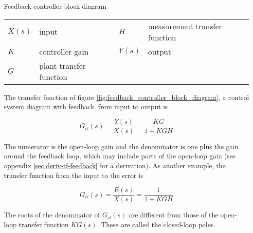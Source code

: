 \begin{bookfigure}

  \caption{Feedback controller block diagram}
  \label{fig:feedback_controller_block_diagram}

  \begin{figurekey}
    \begin{tabulary}{\linewidth}{LLLL}
      $X(s)$ & input & $H$ & measurement transfer function \\
      $K$ & controller gain & $Y(s)$ & output \\
      $G$ & plant transfer function & & \\
    \end{tabulary}
  \end{figurekey}
\end{bookfigure}

The transfer function of figure \ref{fig:feedback_controller_block_diagram}, a
control system diagram with feedback, from input to output is

\begin{equation}
  G_{cl}(s) = \frac{Y(s)}{X(s)} = \frac{KG}{1 + KGH}
\end{equation}

The numerator is the \gls{open-loop gain} and the denominator is one plus the
gain around the feedback loop, which may include parts of the
\gls{open-loop gain} (see appendix \ref{sec:deriv-tf-feedback} for a
derivation). As another example, the transfer function from the input to the
error is

\begin{equation}
  G_{cl}(s) = \frac{E(s)}{X(s)} = \frac{1}{1 + KGH}
\end{equation}

The roots of the denominator of $G_{cl}(s)$ are different from those of the
open-loop transfer function $KG(s)$. These are called the closed-loop poles.

